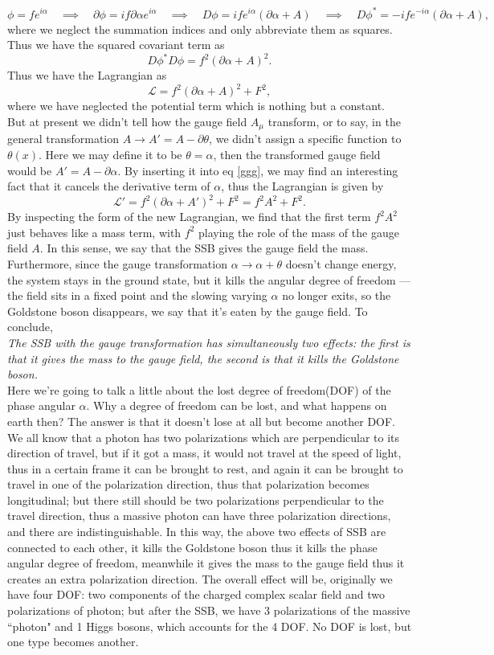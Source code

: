 \documentclass{article}
\newcommand{\be}{\begin{equation}}
\newcommand{\ee}{\end{equation}}
\newcommand{\p}{\partial}
\renewcommand{\1}{\left}
\renewcommand{\2}{\right}
\newcommand{\ma}{\mathcal}
\newcommand{\rar}{\quad\implies\quad}
\newcommand{\m}{\mu}
\newcommand{\al}{\alpha}
\renewcommand{\th}{\theta}
\begin{document}
\be
\phi=fe^{i\al} \rar \p\phi=if\p\al e^{i\al} \rar D\phi=ife^{i\al}(\p\al+A) \rar D\phi^*=-ife^{-i\al}(\p\al+A),
\ee
where we neglect the summation indices and only abbreviate them as squares. Thus we have the squared covariant term as
\be D\phi^*D\phi=f^2 (\p\al+A)^2. \ee
Thus we have the Lagrangian as 
\be\label{ggg}
\ma L=f^2 (\p\al+A)^2+F^2,
\ee
where we have neglected the potential term which is nothing but a constant.\\
But at present we didn't tell how the gauge field $A_\m$ transform, or to say, in the general transformation $A\rightarrow A'=A-\p\th$, we didn't assign a specific function to $\th(x)$. Here we may define it to be $\th=\al$, then the transformed gauge field would be $A'=A-\p\al$. By inserting it into eq \eqref{ggg}, we may find an interesting fact that it cancels the derivative term of $\al$, thus the Lagrangian is given by
\be
\ma L'=f^2 (\p\al+A')^2+F^2=f^2 A^2+F^2.
\ee
By inspecting the form of the new Lagrangian, we find that the first term $f^2 A^2$ just behaves like a mass term, with $f^2$ playing the role of the mass of the gauge  field $A$. In this sense, we say that the SSB gives the gauge field the mass. Furthermore, since the gauge transformation $\al\rightarrow \al+\th$ doesn't change energy, the system stays in the ground state, but it kills the angular degree of freedom --- the field sits in a fixed point and the slowing varying $\al$ no longer exits, so the Goldstone boson disappears, we say that it's eaten by the gauge field. To conclude,\\

\textit{The SSB with the gauge transformation has simultaneously two effects: the first is that it gives the mass to the gauge field, the second is that it kills the Goldstone boson.}\\

Here we're going to talk a little about the lost degree of freedom(DOF) of the phase angular $\al$. Why a degree of freedom can be lost, and what happens on earth then? The answer is that it doesn't lose at all but become another DOF. We all know that a photon has two polarizations which are perpendicular to its direction of travel, but if it got a mass, it would not travel at the speed of light, thus in a certain frame it can be brought to rest, and again it can be brought to travel in one of the polarization direction, thus that polarization becomes longitudinal; but there still should be two polarizations perpendicular to the travel direction, thus a massive photon can have three polarization directions, and there are indistinguishable. In this way, the above two effects of SSB are connected to each other, it kills the Goldstone boson thus it kills the phase angular degree of freedom, meanwhile it gives the mass to the gauge field thus it creates an extra polarization direction. The overall effect will be, originally we have four DOF: two components of the charged complex scalar field and two polarizations of photon; but after the SSB, we have 3 polarizations of the massive ``photon" and 1 Higgs bosons, which accounts for the 4 DOF. No DOF is lost, but one type becomes another.\\
\end{document}
